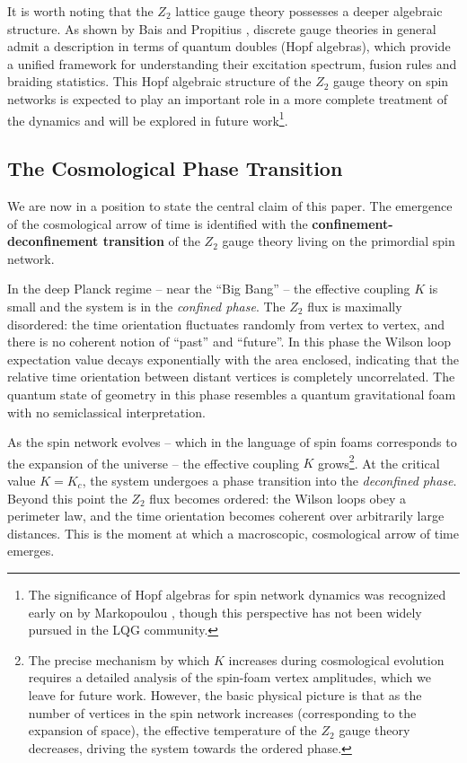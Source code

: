 It is worth noting that the $ Z_2 $ lattice gauge theory possesses a deeper algebraic structure. As shown by Bais and Propitius \cite{Propitius1996Discrete}, discrete gauge theories in general admit a description in terms of quantum doubles (Hopf algebras), which provide a unified framework for understanding their excitation spectrum, fusion rules and braiding statistics. This Hopf algebraic structure of the $ Z_2 $ gauge theory on spin networks is expected to play an important role in a more complete treatment of the dynamics and will be explored in future work\footnote{The significance of Hopf algebras for spin network dynamics was recognized early on by Markopoulou \cite{Markopoulou1997Dual,Markopoulou2000Quantum}, though this perspective has not been widely pursued in the LQG community.}.

\subsection{The Cosmological Phase Transition}\label{subsec:cosmological-transition}

We are now in a position to state the central claim of this paper. The emergence of the cosmological arrow of time is identified with the \textbf{confinement-deconfinement transition} of the $ Z_2 $ gauge theory living on the primordial spin network.

In the deep Planck regime -- near the ``Big Bang'' -- the effective coupling $ K $ is small and the system is in the \emph{confined phase}. The $ Z_2 $ flux is maximally disordered: the time orientation fluctuates randomly from vertex to vertex, and there is no coherent notion of ``past'' and ``future''. In this phase the Wilson loop expectation value decays exponentially with the area enclosed, indicating that the relative time orientation between distant vertices is completely uncorrelated. The quantum state of geometry in this phase resembles a quantum gravitational foam with no semiclassical interpretation.

As the spin network evolves -- which in the language of spin foams corresponds to the expansion of the universe -- the effective coupling $ K $ grows\footnote{The precise mechanism by which $ K $ increases during cosmological evolution requires a detailed analysis of the spin-foam vertex amplitudes, which we leave for future work. However, the basic physical picture is that as the number of vertices in the spin network increases (corresponding to the expansion of space), the effective temperature of the $ Z_2 $ gauge theory decreases, driving the system towards the ordered phase.}. At the critical value $ K = K_c $, the system undergoes a phase transition into the \emph{deconfined phase}. Beyond this point the $ Z_2 $ flux becomes ordered: the Wilson loops obey a perimeter law, and the time orientation becomes coherent over arbitrarily large distances. This is the moment at which a macroscopic, cosmological arrow of time emerges.

